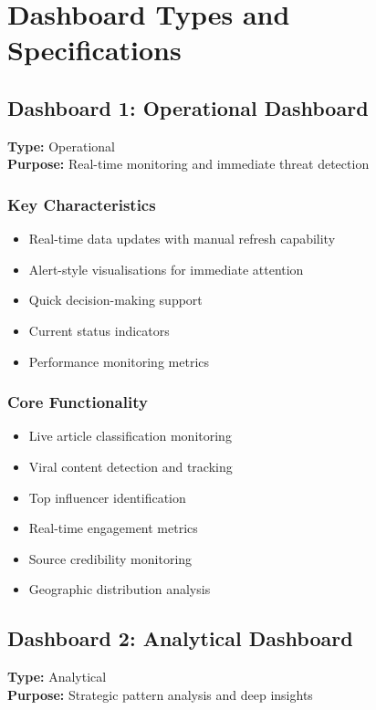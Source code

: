 \documentclass[11pt,a4paper]{article}
\begin{document}
\section{Dashboard Types and Specifications}

\subsection{Dashboard 1: Operational Dashboard}
\textbf{Type:} Operational\\
\textbf{Purpose:} Real-time monitoring and immediate threat detection

\subsubsection{Key Characteristics}
\begin{itemize}
    \item Real-time data updates with manual refresh capability
    \item Alert-style visualisations for immediate attention
    \item Quick decision-making support
    \item Current status indicators
    \item Performance monitoring metrics
\end{itemize}

\subsubsection{Core Functionality}
\begin{itemize}
    \item Live article classification monitoring
    \item Viral content detection and tracking
    \item Top influencer identification
    \item Real-time engagement metrics
    \item Source credibility monitoring
    \item Geographic distribution analysis
\end{itemize}

\subsection{Dashboard 2: Analytical Dashboard}
\textbf{Type:} Analytical\\
\textbf{Purpose:} Strategic pattern analysis and deep insights
\end{document}
